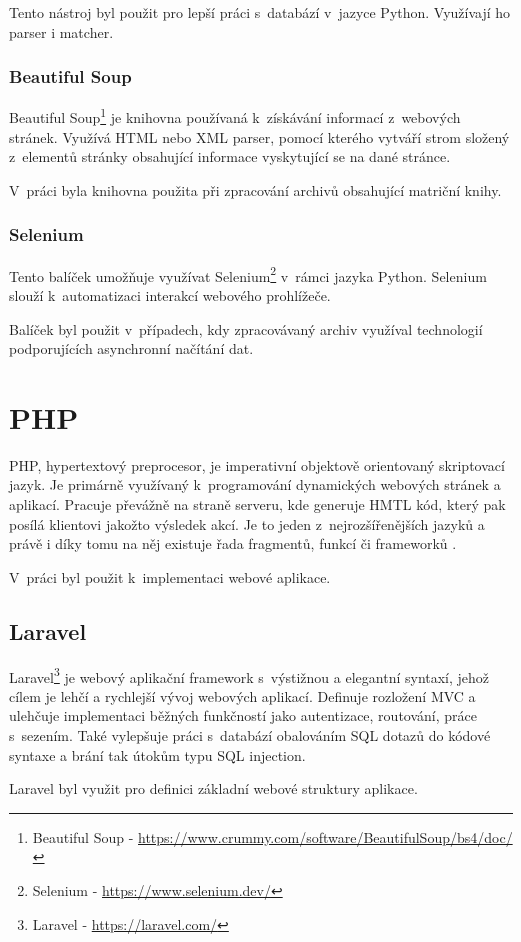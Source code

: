 Tento nástroj byl použit pro lepší práci s~databází v~jazyce Python. Využívají ho parser i matcher. 
\subsubsection{Beautiful Soup}
Beautiful Soup\footnote{Beautiful Soup - \url{https://www.crummy.com/software/BeautifulSoup/bs4/doc/}} je knihovna používaná k~získávání informací z~webových stránek. Využívá HTML nebo XML parser, pomocí kterého vytváří strom složený z~elementů stránky obsahující informace vyskytující se na dané stránce. 

V~práci byla knihovna použita při zpracování archivů obsahující matriční knihy.
\subsubsection{Selenium}
Tento balíček umožňuje využívat Selenium\footnote{Selenium - \url{https://www.selenium.dev/}} v~rámci jazyka Python. Selenium slouží k~automatizaci interakcí webového prohlížeče.

Balíček byl použit v~případech, kdy zpracovávaný archiv využíval technologií podporujících asynchronní načítání dat.
\section{PHP}
PHP, hypertextový preprocesor, je imperativní objektově orientovaný skriptovací jazyk. Je primárně využívaný k~programování dynamických webových stránek a aplikací. Pracuje převážně na straně serveru, kde generuje HMTL kód, který pak posílá klientovi jakožto výsledek akcí. Je to jeden z~nejrozšířenějších jazyků a právě i díky tomu na něj existuje řada fragmentů, funkcí či frameworků \cite{php}.

V~práci byl použit k~implementaci webové aplikace.
\subsection{Laravel}
Laravel\footnote{Laravel - \url{https://laravel.com/}} je webový aplikační framework s~výstižnou a elegantní syntaxí, jehož cílem je lehčí a rychlejší vývoj webových aplikací. Definuje rozložení MVC a ulehčuje implementaci běžných funkčností jako autentizace, routování, práce s~sezením. Také vylepšuje práci s~databází obalováním SQL dotazů do kódové syntaxe a brání tak útokům typu SQL injection.

Laravel byl využit pro definici základní webové struktury aplikace.

